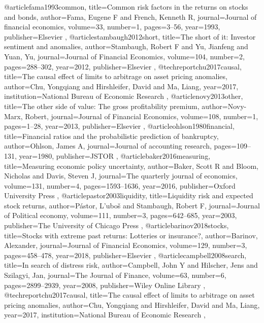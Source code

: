 @article{fama1993common,
  title={Common risk factors in the returns on stocks and bonds},
  author={Fama, Eugene F and French, Kenneth R},
  journal={Journal of financial economics},
  volume={33},
  number={1},
  pages={3--56},
  year={1993},
  publisher={Elsevier}
},
@article{stambaugh2012short,
  title={The short of it: Investor sentiment and anomalies},
  author={Stambaugh, Robert F and Yu, Jianfeng and Yuan, Yu},
  journal={Journal of Financial Economics},
  volume={104},
  number={2},
  pages={288--302},
  year={2012},
  publisher={Elsevier}
},
@techreport{chu2017causal,
  title={The causal effect of limits to arbitrage on asset pricing anomalies},
  author={Chu, Yongqiang and Hirshleifer, David and Ma, Liang},
  year={2017},
  institution={National Bureau of Economic Research}
},
@article{novy2013other,
  title={The other side of value: The gross profitability premium},
  author={Novy-Marx, Robert},
  journal={Journal of Financial Economics},
  volume={108},
  number={1},
  pages={1--28},
  year={2013},
  publisher={Elsevier}
},
@article{ohlson1980financial,
  title={Financial ratios and the probabilistic prediction of bankruptcy},
  author={Ohlson, James A},
  journal={Journal of accounting research},
  pages={109--131},
  year={1980},
  publisher={JSTOR}
},
@article{baker2016measuring,
  title={Measuring economic policy uncertainty},
  author={Baker, Scott R and Bloom, Nicholas and Davis, Steven J},
  journal={The quarterly journal of economics},
  volume={131},
  number={4},
  pages={1593--1636},
  year={2016},
  publisher={Oxford University Press}
},
@article{pastor2003liquidity,
  title={Liquidity risk and expected stock returns},
  author={P{\'a}stor, L'ubo{\v{s}} and Stambaugh, Robert F},
  journal={Journal of Political economy},
  volume={111},
  number={3},
  pages={642--685},
  year={2003},
  publisher={The University of Chicago Press}
},
@article{barinov2018stocks,
  title={Stocks with extreme past returns: Lotteries or insurance?},
  author={Barinov, Alexander},
  journal={Journal of Financial Economics},
  volume={129},
  number={3},
  pages={458--478},
  year={2018},
  publisher={Elsevier}
},
@article{campbell2008search,
  title={In search of distress risk},
  author={Campbell, John Y and Hilscher, Jens and Szilagyi, Jan},
  journal={The Journal of Finance},
  volume={63},
  number={6},
  pages={2899--2939},
  year={2008},
  publisher={Wiley Online Library}
},
@techreport{chu2017causal,
  title={The causal effect of limits to arbitrage on asset pricing anomalies},
  author={Chu, Yongqiang and Hirshleifer, David and Ma, Liang},
  year={2017},
  institution={National Bureau of Economic Research}
},
